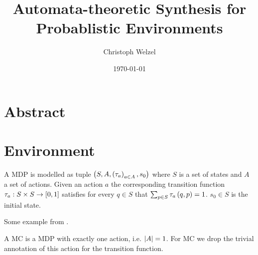\documentclass[twoside, a4paper, fontsize=12pt, draft]{scrbook}
\title{Automata-theoretic Synthesis for Probablistic Environments}
\author{Christoph Welzel}
\date{\today}
\begin{document}
\maketitle
\listoffixmes{}
\frontmatter{}
\chapter{Abstract}
\mainmatter{}
\chapter{Environment}
\begin{definition}
  A \ac{MDP} is modelled as tuple $\left(S, A, \left(\tau_{a}\right)_{a\in A}, s_{0}\right)$
  where $S$ is a set of states and $A$ a set of actions. Given an action $a$ the
  corresponding transition function $\tau_{a}:S\times S\rightarrow \left[0,1\right]$
  satisfies for every $q\in S$ that $\sum_{p\in S}\tau_{a}\left(q,p\right) = 1$.
  $s_{0}\in S$ is the initial state.
\end{definition}
Some example from \cite{SynProbEnv}.
\begin{definition}
  A \ac{MC} is a \ac{MDP} with exactly one action, i.e. $\left\vert{A}\right\vert = 1$. For \ac{MC}
  we drop the trivial annotation of this action for the transition function.
\end{definition}
\backmatter{}
\printbibliography
\end{document}
